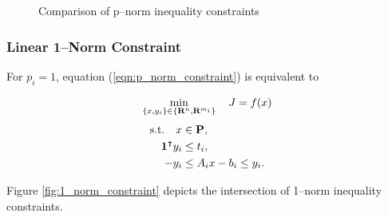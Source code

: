 \documentclass{article}
\begin{document}
    \begin{figure}[h!]
        \centering
        \qquad
        \qquad
        \caption{Comparison of p--norm inequality constraints}%
        \label{fig:LPvsQP}%
    \end{figure}

\subsubsection{Linear 1--Norm Constraint}

    For $p_i=1$, equation (\ref{eqn:p_norm_constraint}) is equivalent to

    \begin{align*}
        \min_{\{x,y_i\}\in\{\textbf{R}^n,\textbf{R}^{m_i}\}} \quad J =f(x)
    \end{align*}
    \begin{align*}
        \text{s.t.}\quad x&\in\textbf{P},\\
        \textbf{1}^\intercal y_i&\leq t_i,\\
        -y_i&\leq A_ix-b_i\leq y_i.
    \end{align*}

    Figure \ref{fig:1_norm_constraint} depicts the intersection of 1--norm inequality constraints.
\end{document}
